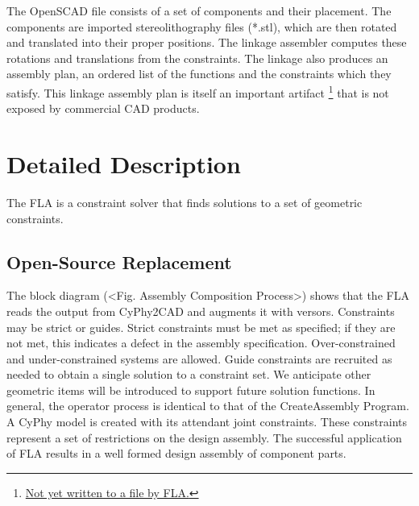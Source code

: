 \documentclass[]{report}
\begin{document}
The OpenSCAD file consists of a set of components and their placement. 
The components are imported stereolithography files (*.stl), 
which are then rotated and translated into their proper positions. 
The linkage assembler computes these rotations and translations from the constraints. 
The linkage also produces an assembly plan, an ordered list of 
the functions and the constraints which they satisfy. 
This linkage assembly plan is itself an important artifact
\footnote{\url{Not yet written to a file by FLA.}} 
that is not exposed by commercial CAD products.

\section{Detailed Description}

The FLA is a constraint solver that finds solutions to a set of geometric constraints.

\subsection{Open-Source Replacement}

The block diagram (<Fig. Assembly Composition Process>) shows that 
the FLA reads the output from CyPhy2CAD and augments it with versors. 
Constraints may be strict or guides. Strict constraints must be met as specified; 
if they are not met, this indicates a defect in the assembly specification. 
Over-constrained and under-constrained systems are allowed. 
Guide constraints are recruited as needed to obtain a single 
solution to a constraint set. We anticipate other geometric 
items will be introduced to support future solution functions. 
In general, the operator process is identical to that of the CreateAssembly Program. 
A CyPhy model is created with its attendant joint constraints. 
These constraints represent a set of restrictions on the design assembly. 
The successful application of FLA results in a well formed design assembly of component parts. 
\end{document}
